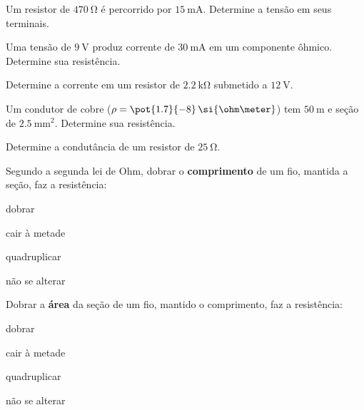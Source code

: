 \blocofixacao
\begin{questao}[1]{}

Um resistor de $\SI{470}{\ohm}$ é percorrido por $\SI{15}{\milli\ampere}$.
Determine a tensão em seus terminais.


\end{questao}
\begin{questao}[1]{}

Uma tensão de $\SI{9}{\volt}$ produz corrente de
$\SI{30}{\milli\ampere}$ em um componente ôhmico. Determine sua resistência.


\end{questao}
\begin{questao}[1]{}

Determine a corrente em um resistor de $\SI{2.2}{\kilo\ohm}$ submetido a
$\SI{12}{\volt}$.


\end{questao}
\begin{questao}[1]{}

Um condutor de cobre ($\rho=\pot{1.7}{-8}\,\si{\ohm\meter}$) tem
$\SI{50}{\meter}$ e seção de $\SI{2.5}{\milli\meter\squared}$. Determine sua
resistência.


\end{questao}
\begin{questao}[1]{}

Determine a condutância de um resistor de $\SI{25}{\ohm}$.


\end{questao}
\begin{questao}[1]{}

Segundo a segunda lei de Ohm, dobrar o \textbf{comprimento} de um fio, mantida
a seção, faz a resistência:
\begin{alternativas}[2]
\item dobrar
\item cair à metade
\item quadruplicar
\item não se alterar
\end{alternativas}


\end{questao}
\begin{questao}[1]{}

Dobrar a \textbf{área} da seção de um fio, mantido o comprimento, faz a
resistência:
\begin{alternativas}[2]
\item dobrar
\item cair à metade
\item quadruplicar
\item não se alterar
\end{alternativas}


\end{questao}
